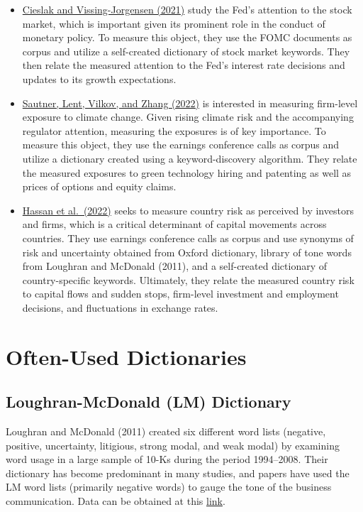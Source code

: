 \documentclass[
]{book}
\providecommand{\tightlist}{%
  \setlength{\itemsep}{0pt}\setlength{\parskip}{0pt}}
\begin{document}
\begin{itemize}
\tightlist
\item
  \href{https://academic.oup.com/rfs/article-abstract/34/9/4045/5917640}{Cieslak and Vissing-Jorgensen (2021)} study the Fed's attention to the stock market, which is important given its prominent role in the conduct of monetary policy. To measure this object, they use the FOMC documents as corpus and utilize a self-created dictionary of stock market keywords. They then relate the measured attention to the Fed's interest rate decisions and updates to its growth expectations.
\item
  \href{https://papers.ssrn.com/sol3/papers.cfm?abstract_id=3642508}{Sautner, Lent, Vilkov, and Zhang (2022)} is interested in measuring firm-level exposure to climate change. Given rising climate risk and the accompanying regulator attention, measuring the exposures is of key importance. To measure this object, they use the earnings conference calls as corpus and utilize a dictionary created using a keyword-discovery algorithm. They relate the measured exposures to green technology hiring and patenting as well as prices of options and equity claims.
\item
  \href{https://www.nber.org/papers/w29526}{Hassan et al.~(2022)} seeks to measure country risk as perceived by investors and firms, which is a critical determinant of capital movements across countries. They use earnings conference calls as corpus and use synonyms of risk and uncertainty obtained from Oxford dictionary, library of tone words from Loughran and McDonald (2011), and a self-created dictionary of country-specific keywords. Ultimately, they relate the measured country risk to capital flows and sudden stops, firm-level investment and employment decisions, and fluctuations in exchange rates.
\end{itemize}

\hypertarget{often-used-dictionaries}{%
\section{Often-Used Dictionaries}\label{often-used-dictionaries}}

\hypertarget{loughran-mcdonald-lm-dictionary}{%
\subsection{Loughran-McDonald (LM) Dictionary}\label{loughran-mcdonald-lm-dictionary}}

Loughran and McDonald (2011) created six different word lists (negative, positive, uncertainty, litigious, strong modal, and weak modal) by examining word usage in a large sample of 10-Ks during the period 1994--2008. Their dictionary has become predominant in many studies, and papers have used the LM word lists (primarily negative words) to gauge the tone of the business communication. Data can be obtained at this \href{https://sraf.nd.edu/loughranmcdonald-master-dictionary/}{link}.
\end{document}
